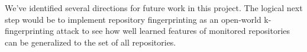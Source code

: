 \documentclass[sigconf,authorversion,nonacm]{acmart}
\begin{document}
We've identified several directions for future work in this project. The logical next step would be to implement repository fingerprinting as an open-world k-fingerprinting attack to see how well learned features of monitored repositories can be generalized to the set of all repositories.






\end{document}
